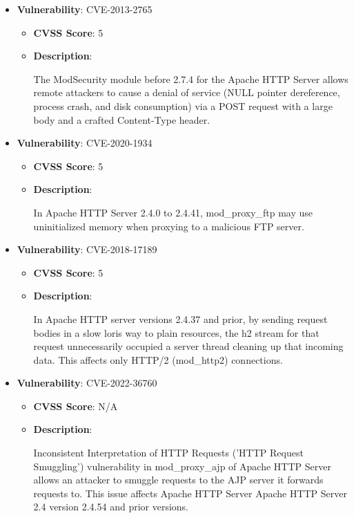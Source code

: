 \documentclass{article}
\begin{document}
\begin{itemize}
        \item \textbf{Vulnerability}: CVE-2013-2765
        \begin{itemize}
            \item \textbf{CVSS Score}:  5 
            \item \textbf{Description}:
            \parbox[t]{0.9\linewidth}{
                \ttfamily The ModSecurity module before 2.7.4 for the Apache HTTP Server allows remote attackers to cause a denial of service (NULL pointer dereference, process crash, and disk consumption) via a POST request with a large body and a crafted Content-Type header.
            }
        \end{itemize}
    
        \item \textbf{Vulnerability}: CVE-2020-1934
        \begin{itemize}
            \item \textbf{CVSS Score}:  5 
            \item \textbf{Description}:
            \parbox[t]{0.9\linewidth}{
                \ttfamily In Apache HTTP Server 2.4.0 to 2.4.41, mod\_proxy\_ftp may use uninitialized memory when proxying to a malicious FTP server.
            }
        \end{itemize}
    
        \item \textbf{Vulnerability}: CVE-2018-17189
        \begin{itemize}
            \item \textbf{CVSS Score}:  5 
            \item \textbf{Description}:
            \parbox[t]{0.9\linewidth}{
                \ttfamily In Apache HTTP server versions 2.4.37 and prior, by sending request bodies in a slow loris way to plain resources, the h2 stream for that request unnecessarily occupied a server thread cleaning up that incoming data. This affects only HTTP/2 (mod\_http2) connections.
            }
        \end{itemize}
    
        \item \textbf{Vulnerability}: CVE-2022-36760
        \begin{itemize}
            \item \textbf{CVSS Score}:  N/A 
            \item \textbf{Description}:
            \parbox[t]{0.9\linewidth}{
                \ttfamily Inconsistent Interpretation of HTTP Requests ('HTTP Request Smuggling') vulnerability in mod\_proxy\_ajp of Apache HTTP Server allows an attacker to smuggle requests to the AJP server it forwards requests to.  This issue affects Apache HTTP Server Apache HTTP Server 2.4 version 2.4.54 and prior versions.
            }
        \end{itemize}
    

\end{itemize}
\end{document}
